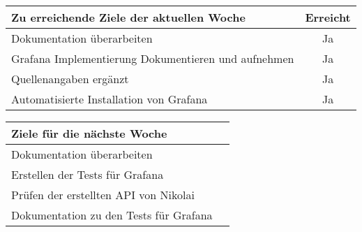 \begin{tabularx}{\textwidth}{Xc}
    \arrayrulecolor{OliveGreen}
    \toprule
    {\bfseries Zu erreichende Ziele der aktuellen Woche} & {\bfseries Erreicht} \\
    \midrule[2pt]
    Dokumentation überarbeiten                              &Ja              \\
    \rowcolor{OliveGreen!15}
    Grafana Implementierung Dokumentieren und aufnehmen     &Ja              \\
    \rowcolor{White}
    Quellenangaben ergänzt                                  &Ja              \\
    \rowcolor{OliveGreen!15}
    Automatisierte Installation von Grafana                 &Ja              \\
   \bottomrule[2pt]
\end{tabularx}
%
\vspace{1cm}
%
\begin{tabularx}{\textwidth}{Xc}
    \arrayrulecolor{OliveGreen}
    \toprule
    {\bfseries Ziele für die nächste Woche}        &                         \\
    \midrule[2pt]
    Dokumentation überarbeiten                     &                         \\
    \rowcolor{OliveGreen!15}
    Erstellen der Tests für Grafana               &                          \\
    \rowcolor{White}
    Prüfen der erstellten API von Nikolai         &                          \\
    \rowcolor{OliveGreen!15}
    Dokumentation zu den Tests für Grafana        &                          \\
\end{tabularx}
